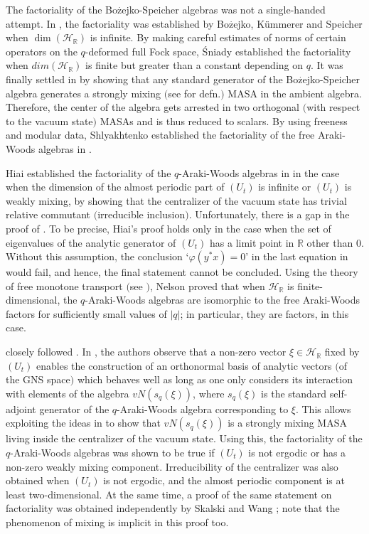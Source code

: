 \documentclass[12pt, a4paper,reqno]{amsart}
\theoremstyle{definition}
\def\R{\mathbb R}
\newcommand{\CH}{\mathcal{H}}
\newcommand{\abs}[1]{\left\vert#1\right\vert}
\begin{document}
The factoriality of the Bo$\overset{.}{\text{z}}$ejko-Speicher algebras was not a single-handed attempt. In \cite{BKS}, the factoriality was established by Bo$\overset{.}{\text{z}}$ejko, K\"{u}mmerer and Speicher when $\dim(\CH_\R)$ is infinite. By making careful estimates of norms of certain operators on the $q$-deformed full Fock space, \'{S}niady established the factoriality when $dim(\CH_\R)$ is finite but greater than a constant depending on $q$. It was finally settled in \cite{ER} by showing that any standard generator of the Bo$\overset{.}{\text{z}}$ejko-Speicher algebra generates a strongly mixing $($see \cite{CFM2} for defn.$)$ MASA in the ambient algebra. Therefore, the center of the algebra gets arrested in two orthogonal $($with respect to the vacuum state$)$ MASAs and is thus reduced to scalars.  By using freeness and modular data, Shlyakhtenko established the factoriality of the free Araki-Woods algebras in \cite{Shlyakhtenko}. 

Hiai established the factoriality of the $q$-Araki-Woods algebras in \cite{Hiai} in the case when the dimension of the almost periodic part of $(U_t)$ is infinite or  $(U_t)$ is weakly mixing, by showing that the centralizer of the vacuum state has trivial relative commutant $($irreducible inclusion$)$. Unfortunately, there is a gap in the proof of \cite[Thm. 3.2]{Hiai}. To be precise, Hiai's proof holds only in the case when the set of eigenvalues of the analytic generator of $(U_t)$ has a limit point in $\R$ other than $0$. Without this assumption, the conclusion `$\varphi(y^{*}x)=0$' in the last equation in \cite[Thm. 3.2]{Hiai} would fail, and hence, the final statement cannot be concluded. Using the theory of free monotone transport $($see \cite[Thm. 4.5]{Ne15}$)$, Nelson proved that when $\CH_{\R}$ is finite-dimensional, the $q$-Araki-Woods algebras are isomorphic to the free Araki-Woods factors for sufficiently small values of $\abs{q}$; in particular, they are factors, in this case. 

\cite{bik-kunal} closely followed \cite{ER}. In \cite{bik-kunal}, the authors observe that a non-zero vector $\xi\in\CH_\R$ fixed by $(U_t)$ enables the construction of an orthonormal basis of analytic vectors $($of the GNS space$)$ which behaves well as long as one only considers its interaction with elements of the algebra $vN(s_q(\xi))$, where $s_q(\xi)$ is the standard self-adjoint generator of the $q$-Araki-Woods algebra corresponding to $\xi$. This allows exploiting the ideas in \cite{ER} to show that $vN(s_q(\xi))$ is a strongly mixing MASA living inside the centralizer of the vacuum state. Using this, the factoriality of the $q$-Araki-Woods algebras was shown to be true if $(U_t)$ is not ergodic or has a non-zero weakly mixing component. Irreducibility of the centralizer was also obtained when $(U_t)$ is not ergodic, and the almost periodic component is at least two-dimensional. {At the same time, a proof of the same statement on factoriality was obtained independently by Skalski and Wang \cite{SW}; note that the phenomenon of mixing is implicit in this proof too}.
\end{document}
